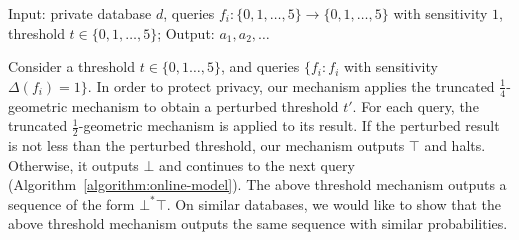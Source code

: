 \begin{algorithm}
\begin{algorithmic}[1]
		\EndMatch
		\EndFor
		\EndProcedure
		
	\end{algorithmic}
	\caption{Input: private database $d$, 
          queries $f_i : \{ 0, 1, \ldots, 5 \} \rightarrow \{ 0, 1,
          \ldots, 5 \}$ with sensitivity $1$, threshold $t \in \{ 0,
          1, \ldots, 5 \}$; Output: $a_1, a_2, \ldots$}
	\label{algorithm:online-model}
\end{algorithm}

Consider a threshold $t \in
\{ 0, 1 \ldots, 5\}$, and queries $\{ f_i : f_i $ with sensitivity $\Delta
(f_i) = 1 \}$. In order to protect privacy, our mechanism applies the
truncated $\frac{1}{4}$-geometric mechanism to obtain a perturbed
threshold $t'$. For each query, the truncated $\frac{1}{2}$-geometric
mechanism is applied to its result. If the perturbed result is not less
than the perturbed threshold, our mechanism outputs $\top$ and
halts. Otherwise, it outputs $\bot$ and continues to the next query
(Algorithm~\ref{algorithm:online-model}). The above threshold
mechanism outputs a sequence of the form $\bot^* \top$. On
similar databases, we would like to show that the above
threshold mechanism outputs the same sequence with similar
probabilities. 

